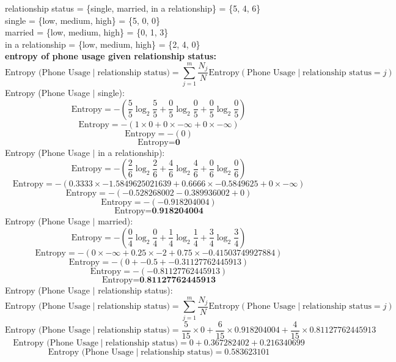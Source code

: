 \documentclass[a3paper,12pt]{extarticle} %
\begin{document}
\begin{enumerate}
\[    \]
    relationship status = \{single, married, in a relationship\} = \{5, 4, 6\}
    \\ single = \{low, medium, high\} = \{5, 0, 0\}
    \\ married = \{low, medium, high\} = \{0, 1, 3\}
    \\ in a relationship = \{low, medium, high\} = \{2, 4, 0\}
    \\ \textbf{entropy of phone usage given relationship status:}
    \[
    \text{Entropy (Phone Usage} \mid \text{relationship status)} = \sum_{j=1}^m \frac{N_j}{N} \text{Entropy}(\text{Phone Usage} \mid \text{relationship status} = j)
    \]
    Entropy (Phone Usage $\mid$ single):
    \[
    \text{Entropy} = -\left(\frac{5}{5} \log_2 \frac{5}{5} + \frac{0}{5} \log_2 \frac{0}{5} + \frac{0}{5} \log_2 \frac{0}{5}\right)
    \]
    \[
    \text{Entropy} = -\left(1 \times 0 + 0 \times -\infty + 0 \times -\infty\right)
    \]
    \[
    \text{Entropy} = -\left(0\right)
    \]
    \[
    \text{Entropy} = \textbf{0}
    \]
    Entropy (Phone Usage $\mid$ in a relationship):
    \[
    \text{Entropy} = -\left(\frac{2}{6} \log_2 \frac{2}{6} + \frac{4}{6} \log_2 \frac{4}{6} + \frac{0}{6} \log_2 \frac{0}{6}\right)
    \]
    \[
    \text{Entropy} = -\left(0.3333 \times -1.5849625021639 + 0.6666 \times -0.5849625 + 0 \times -\infty\right)
    \]
    \[
    \text{Entropy} = -\left(-0.528268002 - 0.389936002 + 0\right)
    \]
    \[
    \text{Entropy} = -\left(-0.918204004\right)
    \]
    \[
    \text{Entropy} = \textbf{0.918204004}
    \]
    Entropy (Phone Usage $\mid$ married):
    \[
    \text{Entropy} = -\left(\frac{0}{4} \log_2 \frac{0}{4} + \frac{1}{4} \log_2 \frac{1}{4} + \frac{3}{4} \log_2 \frac{3}{4}\right)
    \]
    \[
    \text{Entropy} = -\left(0 \times -\infty + 0.25 \times -2 + 0.75 \times -0.41503749927884\right)
    \]
    \[
    \text{Entropy} = -\left(0 + -0.5 + -0.31127762445913\right)
    \]
    \[
    \text{Entropy} = -\left(-0.81127762445913\right)
    \]
    \[
    \text{Entropy} = \textbf{0.81127762445913}
    \]
    Entropy (Phone Usage $\mid$ relationship status):
    \[
    \text{Entropy (Phone Usage} \mid \text{relationship status)} = \sum_{j=1}^m \frac{N_j}{N} \text{Entropy}(\text{Phone Usage} \mid \text{relationship status} = j)
    \]
    \[
    \text{Entropy (Phone Usage} \mid \text{relationship status)} = \frac{5}{15} \times 0 + \frac{6}{15} \times 0.918204004 + \frac{4}{15} \times 0.81127762445913
    \]
    \[
    \text{Entropy (Phone Usage} \mid \text{relationship status)} = 0 + 0.367282402 + 0.216340699
    \]
    \[
    \text{Entropy (Phone Usage} \mid \text{relationship status)} = 0.583623101
\]
\end{enumerate}
\end{document}
